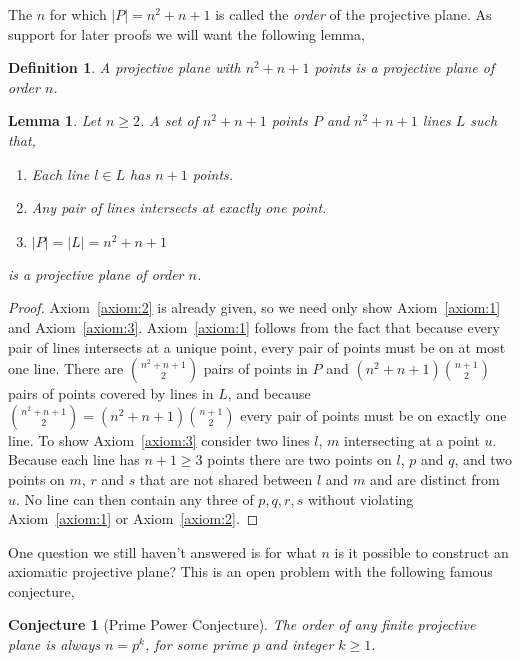 \documentclass{article}
\newtheorem{lemma}{Lemma}
\newtheorem{definition}{Definition}
\newtheorem{conjecture}{Conjecture}
\begin{document}
The \(n\) for which \(|P| = n^2 + n + 1\) is called the \textit{order} of the projective plane.
As support for later proofs we will want the following lemma,

\begin{definition}\label{definition:proj-order}
  A projective plane with \(n^{2} + n + 1\) points is a projective plane of order \(n\).
\end{definition}

\begin{lemma}\label{lemma:easy-proj}
  Let \(n \geq 2\). A set of \(n^{2} + n + 1\) points \(P\) and \(n^{2} + n + 1\) lines \(L\) such that,

  \begin{enumerate}
    \item Each line \(l \in L\) has \(n + 1\) points.
    \item Any pair of lines intersects at exactly one point.
    \item \(|P| = |L| = n^{2} + n + 1\)
  \end{enumerate}

  is a projective plane of order \(n\).
\end{lemma}

\begin{proof}
  Axiom~\ref{axiom:2} is already given, so we need only show Axiom~\ref{axiom:1} and Axiom~\ref{axiom:3}. Axiom~\ref{axiom:1} follows from the fact that because every pair of lines intersects at a unique point, every pair of points must be on at most one line. There are \(\binom{n^{2} + n + 1}{2}\) pairs of points in \(P\) and \((n^{2} + n + 1)\binom{n + 1}{2}\) pairs of points covered by lines in \(L\), and because \(\binom{n^{2} + n + 1}{2} = (n^{2} + n + 1)\binom{n + 1}{2}\) every pair of points must be on exactly one line.
  To show Axiom~\ref{axiom:3} consider two lines \(l\), \(m\) intersecting at a point \(u\). Because each line has \(n + 1 \geq 3\) points there are two points on \(l\), \(p\) and \(q\), and two points on \(m\), \(r\) and \(s\) that are not shared between \(l\) and \(m\) and are distinct from \(u\). No line can then contain any three of \(p, q, r, s\) without violating Axiom~\ref{axiom:1} or Axiom~\ref{axiom:2}.
\end{proof}

One question we still haven't answered is for what \(n\) is it possible to construct an axiomatic projective plane? This is an open problem with the following famous conjecture,

\begin{conjecture}[Prime Power Conjecture]
  The order of any finite projective plane is always \(n = p^k\), for some prime \(p\) and integer \(k \geq 1\).
\end{conjecture}
\end{document}
